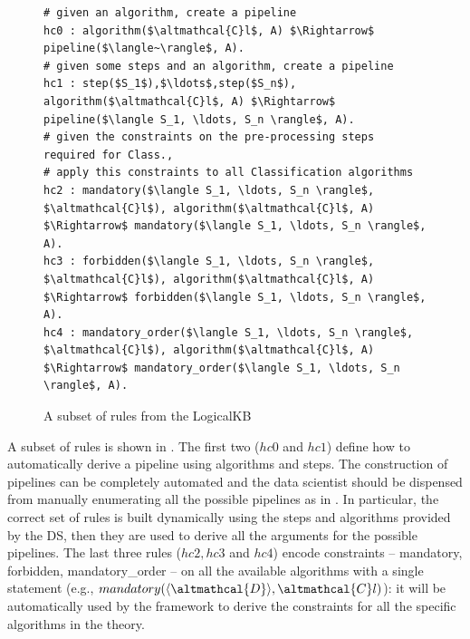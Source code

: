 \begin{figure}[t]
\begin{lstlisting}[mathescape=true, basicstyle=\footnotesize]
# given an algorithm, create a pipeline
hc0 : algorithm($\altmathcal{C}l$, A) $\Rightarrow$ pipeline($\langle~\rangle$, A).
# given some steps and an algorithm, create a pipeline
hc1 : step($S_1$),$\ldots$,step($S_n$), algorithm($\altmathcal{C}l$, A) $\Rightarrow$ pipeline($\langle S_1, \ldots, S_n \rangle$, A).
# given the constraints on the pre-processing steps required for Class., 
# apply this constraints to all Classification algorithms
hc2 : mandatory($\langle S_1, \ldots, S_n \rangle$, $\altmathcal{C}l$), algorithm($\altmathcal{C}l$, A) $\Rightarrow$ mandatory($\langle S_1, \ldots, S_n \rangle$, A).
hc3 : forbidden($\langle S_1, \ldots, S_n \rangle$, $\altmathcal{C}l$), algorithm($\altmathcal{C}l$, A) $\Rightarrow$ forbidden($\langle S_1, \ldots, S_n \rangle$, A).
hc4 : mandatory_order($\langle S_1, \ldots, S_n \rangle$, $\altmathcal{C}l$), algorithm($\altmathcal{C}l$, A) $\Rightarrow$ mandatory_order($\langle S_1, \ldots, S_n \rangle$, A).
\end{lstlisting}
\label{rules-arg2p}\caption{A subset of rules from the LogicalKB}
\end{figure}

A subset of rules is shown in .
The first two ($hc0$ and $hc1$) define how to automatically derive a pipeline using algorithms and steps.
The construction of pipelines can be completely automated and the data scientist should be dispensed from manually enumerating all the possible pipelines as in .
In particular, the correct set of rules is built dynamically using the steps and algorithms provided by the DS, then they are used to derive all the arguments for the possible pipelines.
The last three rules ($hc2, hc3$ and $hc4$) encode constraints -- mandatory, forbidden, mandatory\_order -- on all the available algorithms with a single statement (e.g., $mandatory(\langle \altmathcal{D} \rangle, \altmathcal{C}l)$): it will be automatically used by the framework to derive the constraints for all the specific algorithms in the theory.

